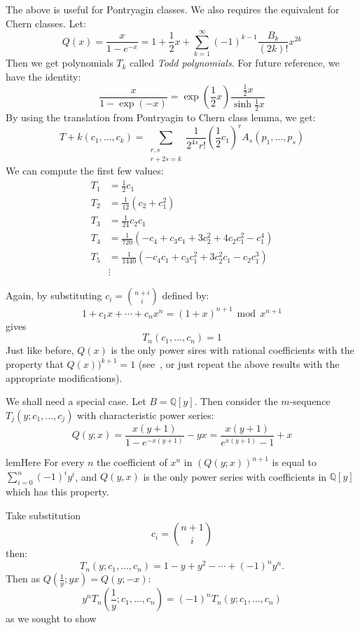 \documentclass{book}
\newcommand{\Q}{{\mathbb{Q}}}
\renewcommand{\mod}{\,\operatorname{mod}\,}
\begin{document}
The above is useful for Pontryagin classes. We also requires the equivalent for Chern classes. Let:
\[
  Q(x) = \frac{x}{1-e^{-x}} = 1 + \frac{1}{2}x + \sum_{k=1}^\infty (-1)^{k-1} \frac{B_k}{(2k)!}x^{2k}
\]
Then we get polynomials $T_k$ called \emph{Todd polynomials}. For future reference, we have the identity:
\[
  \frac{x}{1-\exp(-x)} = \exp \left(\frac{1}{2}x\right) \frac{\frac{1}{2}x}{\sinh \frac{1}{2}x}
\]
By using the translation from Pontryagin to Chern class lemma, we get:
\[
  T+k(c_1, ..., c_k) = \sum_{\substack{r,s\\r+2s=k}} \frac{1}{2^{4s}r!} \left(\frac{1}{2}c_1\right)^r A_s(p_1, ..., p_s)
\]
We can compute the first few values:
\begin{align*}
  T_1 &= \frac{1}{2}c_1\\
  T_2 &= \frac{1}{12} (c_2 + c_1^2)\\
  T_3 &= \frac{1}{24} c_2c_1\\
  T_4 &= \frac{1}{720} (-c_4 + c_3c_1 + 3c_2^2 + 4c_2c_1^2 - c_1^4)\\
  T_5 &= \frac{1}{1440} \left(-c_4c_1 + c_3c_1^2  +3c_2^2c_1 - c_2c_1^3\right) \\
      &\vdots
\end{align*}

Again, by substituting $c_i = \binom{n+i}{i}$ defined by:
\[
  1 + c_1x + \cdots + c_nx^n = (1+x)^{n+1} \mod x^{n+1}
\]
gives
\[
  T_n(c_1, ..., c_n) = 1
\]
Just like before, $Q(x)$ is the only power sires with rational coefficients with the property that
$Q(x))^{k+1} = 1$ (see~\cite[p.14]{hirzebruchTopologicalMethodsAlgebraic1995}, or just repeat the above
results with the appropriate modifications).


We shall need a special case. Let $B = \Q[y]$. Then consider the $m$-sequence $T_j(y; c_1, ..., c_j)$ with
characteristic power series:
\[
  Q(y; x) = \frac{x(y+1)}{1-e^{-x(y+1)}} -yx = \frac{x(y+1)}{e^{x(y+1)}-1}+x
\]


\begin{lem}{}{lemHere}
  For every $n$ the coefficient of $x^n$ in $(Q(y;x))^{n+1}$ is equal to $\sum_{i=0}^n(-1)^iy^i$, and $Q(y,x)$
is the only power series with coefficients in $\mathbb{Q}[y]$ which has this property.
\end{lem}


\begin{Proof}
  Take substitution
\[
    c_i = \binom{n+1}{i}
\]
then:
\[
    T_n(y; c_1,\ldots,c_n) = 1-y+y^2-\cdots+(-1)^ny^n.
\]
Then as $Q(\frac{1}{y};yx) = Q(y;-x)$:
\[
    y^n T_n(\frac{1}{y};c_1,\ldots,c_n) = (-1)^n T_n(y;c_1,\ldots,c_n)
\]
as we sought to show
\end{Proof}
\end{document}

